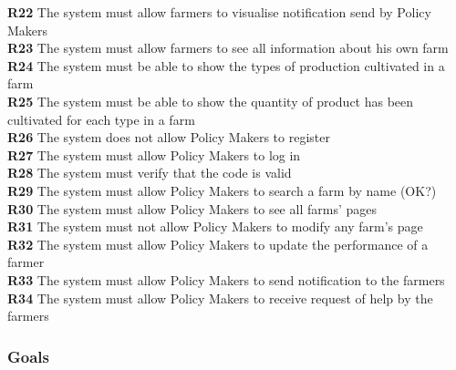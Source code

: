 \textbf{R22} The system must allow farmers to visualise notification send by Policy Makers\\
\textbf{R23} The system must allow farmers to see all information about his own farm\\
\textbf{R24} The system must be able to show the types of production cultivated in a farm\\
\textbf{R25} The system must be able to show the quantity of product has been cultivated for each type in a farm\\
\textbf{R26} The system does not allow Policy Makers to register\\
\textbf{R27} The system must allow Policy Makers to log in\\
\textbf{R28} The system must verify that the code is valid\\
\textbf{R29} The system must allow Policy Makers to search a farm by name (OK?)\\
\textbf{R30} The system must allow Policy Makers to see all farms’ pages\\
\textbf{R31} The system must not allow Policy Makers to modify any farm’s page\\
\textbf{R32} The system must allow Policy Makers to update the performance of a farmer\\
\textbf{R33} The system must allow Policy Makers to send notification to the farmers\\
\textbf{R34} The system must allow Policy Makers to receive request of help by the farmers\\
\newpage

\subsubsection{Goals}

